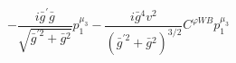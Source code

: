 %
\begin{dmath*}
%
  -  \frac{i {\bar g}^\prime {\bar g}{}}{\sqrt{{\bar g}^{\prime 2} + {\bar g}{}^2}}p_1^{\mu_3}  -  \frac{i {\bar g}{}^4 v^2}{\left({\bar g}^{\prime 2} + {\bar g}{}^2\right)^{3/2}}C^{ \varphi  WB} p_1^{\mu_3}
%
\end{dmath*}
%

